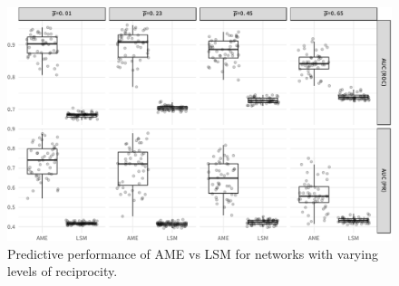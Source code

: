 \documentclass[12pt,pdflatex]{elsarticle}
\begin{document}
\begin{figure}[ht]
	\centering
	\includegraphics[width=1\textwidth]{sim2Viz.pdf}
	\caption{Predictive performance of AME vs LSM for networks with varying levels of reciprocity. }
\end{figure}

\clearpage
% 

\newpage
\end{document}
